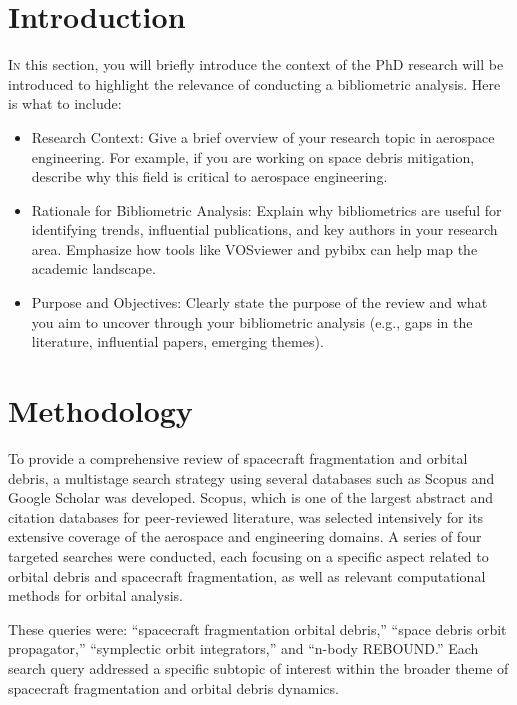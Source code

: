 \documentclass[journal ]{new-aiaa}
\begin{document}
\section{Introduction}
\lettrine{I}{n} this section, you will briefly introduce the context of the PhD research will be introduced to highlight the relevance of conducting a bibliometric analysis. Here is what to include:

\begin{itemize}
    \item Research Context: Give a brief overview of your research topic in aerospace engineering. For example, if you are working on space debris mitigation, describe why this field is critical to aerospace engineering.
    \item Rationale for Bibliometric Analysis: Explain why bibliometrics are useful for identifying trends, influential publications, and key authors in your research area. Emphasize how tools like VOSviewer and pybibx can help map the academic landscape.
    \item Purpose and Objectives: Clearly state the purpose of the review and what you aim to uncover through your bibliometric analysis (e.g., gaps in the literature, influential papers, emerging themes).
\end{itemize}

\section{Methodology}

To provide a comprehensive review of spacecraft fragmentation and orbital debris, a multistage search strategy using several databases such as Scopus and Google Scholar  was developed. Scopus, which is one of the largest abstract and citation databases for peer-reviewed literature, was selected intensively for its extensive coverage of the aerospace and engineering domains. A series of four targeted searches were conducted, each focusing on a specific aspect related to orbital debris and spacecraft fragmentation, as well as relevant computational methods for orbital analysis.

These queries were: “spacecraft fragmentation orbital debris,” “space debris orbit propagator,” “symplectic orbit integrators,” and “n-body REBOUND.” Each search query addressed a specific subtopic of interest within the broader theme of spacecraft fragmentation and orbital debris dynamics.
\end{document}

